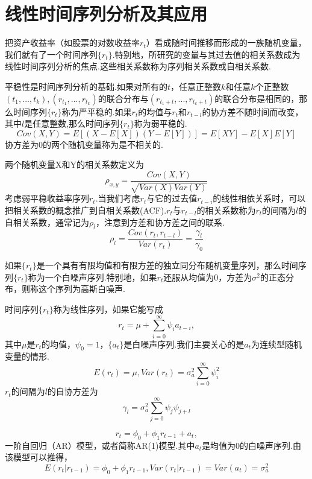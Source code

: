 \documentclass[UTF8]{ctexart}
\begin{document}
\section{线性时间序列分析及其应用}

把资产收益率（如股票的对数收益率$r_t$）看成随时间推移而形成的一族随机变量，我们就有了一个时间序列$\{r_t\}$.特别地，所研究的变量与其过去值的相关系数成为线性时间序列分析的焦点.这些相关系数称为序列相关系数或自相关系数.

\hspace*{\fill}

平稳性是时间序列分析的基础.如果对所有的$t$，任意正整数$k$和任意$k$个正整数$(t_1,...,t_k),(r_{t_1},...,r_{t_k})$的联合分布与$(r_{t_1+t},...,r_{t_k+t})$的联合分布是相同的，那么时间序列$\{r_t\}$称为严平稳的.如果$r_t$的均值与$r_t$和$r_{t-l}$的协方差不随时间而改变，其中$l$是任意整数,那么时间序列$\{r_t\}$称为弱平稳的.\[Cov(X,Y)=E[(X-E[X])(Y-E[Y])]=E[XY]-E[X]E[Y]\]协方差为0的两个随机变量称为是不相关的.

\hspace*{\fill}

两个随机变量X和Y的相关系数定义为\[\rho_{x,y}=\dfrac{Cov(X,Y)}{\sqrt{Var(X)Var(Y)}}\]考虑弱平稳收益率序列$r_t$.当我们考虑$r_t$与它的过去值$r_{t-i}$的线性相依关系时，可以把相关系数的概念推广到自相关系数(ACF).$r_t$与$r_{t-l}$的相关系数称为$r_t$的间隔为$l$的自相关系数，通常记为$\rho_l$，注意到方差和协方差之间的联系.\[\rho_l=\dfrac{Cov(r_t,r_{t-l})}{Var(r_t)}=\dfrac{\gamma_l}{\gamma_0}\]

\hspace*{\fill}

如果$\{r_t\}$是一个具有有限均值和有限方差的独立同分布随机变量序列，那么时间序列$\{r_t\}$称为一个白噪声序列.特别地，如果$r_t$还服从均值为0，方差为$\sigma^{2}$的正态分布，则称这个序列为高斯白噪声.

\hspace*{\fill}

时间序列$\{r_t\}$称为线性序列，如果它能写成\[r_t=\mu + \sum_{i=0}^{\infty}\psi_i a_{t-i},\]其中$\mu$是$r_t$的均值，$\psi_0=1$，$\{a_t\}$是白噪声序列.我们主要关心的是$a_t$为连续型随机变量的情形.\[E(r_t)=\mu,Var(r_t)=\sigma_{a}^2\sum_{i=0}^{\infty}\psi_i^2\]$r_t$的间隔为$l$的自协方差为\[\gamma_l=\sigma_{a}^2\sum_{j=0}^{\infty}\psi_j \psi_{j+l}\]

\hspace*{\fill}

\[r_t=\phi_0+\phi_1 r_{t-1}+a_t,\]一阶自回归（AR）模型，或者简称AR(1)模型.其中$a_t$是均值为0的白噪声序列.由该模型可以推得，\[E(r_t|r_{t-1})=\phi_0+\phi_1 r_{t-1},Var(r_t|r_{t-1})=Var(a_t)=\sigma_{a}^{2}\]
\end{document}
